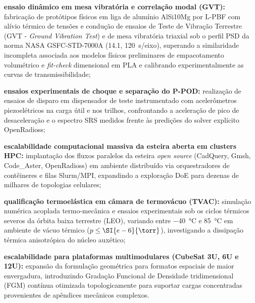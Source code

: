 \begin{alineas}
  \item \textbf{ensaio dinâmico em mesa vibratória e correlação modal (GVT):} fabricação de protótipos físicos em liga de alumínio AlSi10Mg por L-PBF com alívio térmico de tensões e condução de ensaios de Teste de Vibração Terrestre (GVT - \textit{Ground Vibration Test}) e de mesa vibratória triaxial sob o perfil PSD da norma NASA GSFC-STD-7000A (\SI{14.1}{\Grms}, \SI{120}{\second}/eixo), superando a similaridade incompleta associada aos modelos físicos preliminares de empacotamento volumétrico e \textit{fit-check} dimensional em PLA e calibrando experimentalmente as curvas de transmissibilidade;
  
  \item \textbf{ensaios experimentais de choque e separação do P-POD:} realização de ensaios de disparo em dispensador de teste instrumentado com acelerômetros piezoelétricos na carga útil e nos trilhos, confrontando a aceleração de pico de desaceleração e o espectro SRS medidos frente às predições do solver explícito OpenRadioss;
  
  \item \textbf{escalabilidade computacional massiva da esteira aberta em clusters HPC:} implantação dos fluxos paralelos da esteira \textit{open source} (CadQuery, Gmsh, Code\_Aster, OpenRadioss) em ambiente distribuído via orquestradores de contêineres e filas Slurm/MPI, expandindo a exploração DoE para dezenas de milhares de topologias celulares;
  
  \item \textbf{qualificação termoelástica em câmara de termovácuo (TVAC):} simulação numérica acoplada termo-mecânica e ensaios experimentais sob os ciclos térmicos severos da órbita baixa terrestre (LEO), variando entre \SI{-40}{\celsius} e \SI{+85}{\celsius} em ambiente de vácuo térmico ($p \le \SI{e-6}{\torr}$), investigando a dissipação térmica anisotrópica do núcleo auxético;
  
  \item \textbf{escalabilidade para plataformas multimodulares (CubeSat 3U, 6U e 12U):} expansão da formulação geométrica para formatos espaciais de maior envergadura, introduzindo Gradação Funcional de Densidade tridimensional (FGM) contínua otimizada topologicamente para suportar cargas concentradas provenientes de apêndices mecânicos complexos.
\end{alineas}
